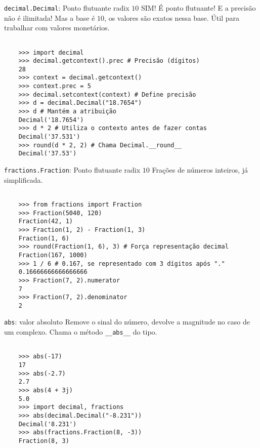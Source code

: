 \documentclass[utf8]{beamer}
\begin{document}
\begin{frame}[fragile]{\texttt{decimal.Decimal}:
                       Ponto flutuante radix $10$}
  SIM! É ponto flutuante! E a precisão não é ilimitada!
  Mas a base é $10$, os valores são exatos nessa base.
  Útil para trabalhar com valores monetários.

  \begin{verbatim}

    >>> import decimal
    >>> decimal.getcontext().prec # Precisão (dígitos)
    28
    >>> context = decimal.getcontext()
    >>> context.prec = 5
    >>> decimal.setcontext(context) # Define precisão
    >>> d = decimal.Decimal("18.7654")
    >>> d # Mantém a atribuição
    Decimal('18.7654')
    >>> d * 2 # Utiliza o contexto antes de fazer contas
    Decimal('37.531')
    >>> round(d * 2, 2) # Chama Decimal.__round__
    Decimal('37.53')

  \end{verbatim}

\end{frame}


\begin{frame}[fragile]{\texttt{fractions.Fraction}:
                       Ponto flutuante radix $10$}
  Frações de números inteiros, já simplificada.

  \begin{verbatim}

    >>> from fractions import Fraction
    >>> Fraction(5040, 120)
    Fraction(42, 1)
    >>> Fraction(1, 2) - Fraction(1, 3)
    Fraction(1, 6)
    >>> round(Fraction(1, 6), 3) # Força representação decimal
    Fraction(167, 1000)
    >>> 1 / 6 # 0.167, se representado com 3 dígitos após "."
    0.16666666666666666
    >>> Fraction(7, 2).numerator
    7
    >>> Fraction(7, 2).denominator
    2

  \end{verbatim}

\end{frame}


\begin{frame}[fragile]{\texttt{abs}: valor absoluto}
  Remove o sinal do número,
  devolve a magnitude no caso de um complexo.
  Chama o método \texttt{__abs__} do tipo.

  \begin{verbatim}

    >>> abs(-17)
    17
    >>> abs(-2.7)
    2.7
    >>> abs(4 + 3j)
    5.0
    >>> import decimal, fractions
    >>> abs(decimal.Decimal("-8.231"))
    Decimal('8.231')
    >>> abs(fractions.Fraction(8, -3))
    Fraction(8, 3)

  \end{verbatim}

\end{frame}
\end{document}
